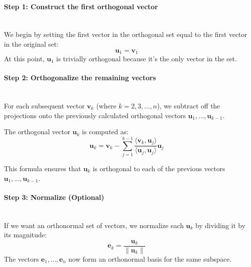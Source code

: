 \documentclass[]{article}
\begin{document}
	\paragraph{Step 1: Construct the first orthogonal vector}
	\noindent\\
	We begin by setting the first vector in the orthogonal set equal to the first vector in the original set:
	$$ \mathbf{u}_1 = \mathbf{v}_1 $$
	At this point, $\mathbf{u}_1$ is trivially orthogonal because it's the only vector in the set.
	
	\paragraph{Step 2: Orthogonalize the remaining vectors}
	\noindent\\
	For each subsequent vector $\mathbf{v}_k$ (where $k = 2, 3, \dots, n$), we subtract off the projections onto the previously calculated orthogonal vectors $\mathbf{u}_1, \dots, \mathbf{u}_{k-1}$.
	
	The orthogonal vector $\mathbf{u}_k$ is computed as:
	$$
	\mathbf{u}_k = \mathbf{v}_k - \sum_{j=1}^{k-1} \frac{\langle \mathbf{v}_k, \mathbf{u}_j \rangle}{\langle \mathbf{u}_j, \mathbf{u}_j \rangle} \mathbf{u}_j
	$$
	
	This formula ensures that $\mathbf{u}_k$ is orthogonal to each of the previous vectors $\mathbf{u}_1, \dots, \mathbf{u}_{k-1}$.
	
	\paragraph{Step 3: Normalize (Optional)}
	\noindent\\
	If we want an orthonormal set of vectors, we normalize each $\mathbf{u}_k$ by dividing it by its magnitude:
	$$
	\mathbf{e}_k = \frac{\mathbf{u}_k}{\|\mathbf{u}_k\|}
	$$
	The vectors $\mathbf{e}_1, \dots, \mathbf{e}_n$ now form an orthonormal basis for the same subspace.
	
	
	
\end{document}
